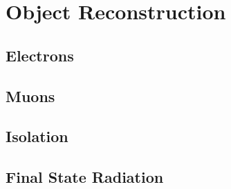 \section{Object Reconstruction}
\label{sec:objects}

\subsection{Electrons}
\label{subsec:el_sel}

\subsection{Muons}
\label{subsec:mu_sel}

\subsection{Isolation}
\label{subsec:iso}

\subsection{Final State Radiation}
\label{subsec:fsr}